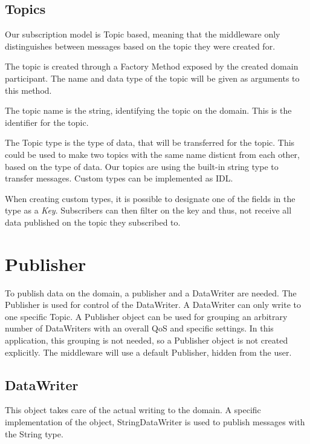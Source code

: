 \begin{center}
\end{center}

\subsection{Topics}
Our subscription model is Topic based, meaning that the middleware only distinguishes between messages based on the topic they were created for. 

The topic is created through a Factory Method exposed by the created domain participant. The name and data type of the topic will be given as arguments to this method. 

The topic name is the string, identifying the topic on the domain. This is the identifier for the topic. 

The Topic type is the type of data, that will be transferred for the topic. This could be used to make two topics with the same name disticnt from each other, based on the type of data.
Our topics are using the built-in string type to transfer messages.
Custom types can be implemented as IDL.

When creating custom types, it is possible to designate one of the fields in the type as a \textit{Key}. Subscribers can then filter on the key and thus, not receive all data published on the topic they subscribed to.

\begin{center}
\end{center}


\section{Publisher}
To publish data on the domain, a publisher and a DataWriter are needed. The Publisher is used for control of the DataWriter. 
A DataWriter can only write to one specific Topic. A Publisher object can be used for grouping an arbitrary number of DataWriters with an overall QoS and specific settings.
In this application, this grouping is not needed, so a Publisher object is not created explicitly. The middleware will use a default Publisher, hidden from the user.

\subsection{DataWriter}
This object takes care of the actual writing to the domain. A specific implementation of the object, StringDataWriter is used to publish messages with the String type. 

